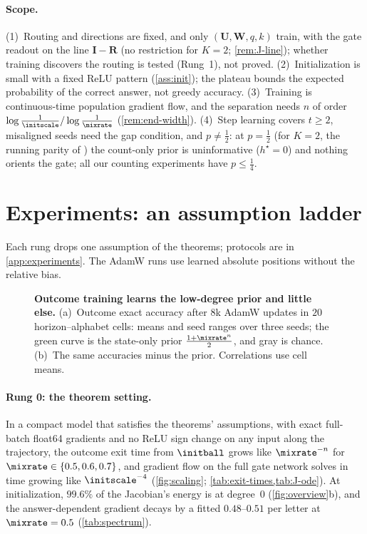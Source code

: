\paragraph{Scope.} (1)~Routing and directions are fixed, and only $(\mathbf U,\mathbf W,q,k)$ train, with the gate readout on the line
$\mathbf I-\mathbf R$ (no restriction for $K=2$; \cref{rem:J-line}); whether training discovers the routing is tested (Rung~1), not proved.
(2)~Initialization is small with a fixed ReLU pattern (\cref{ass:init}); the plateau bounds the expected probability of the correct answer,
not greedy accuracy. (3)~Training is continuous-time population gradient flow, and the separation needs $n$ of order
$\log\frac1\initscale/\log\frac1\mixrate$ (\cref{rem:end-width}). (4)~Step learning covers $t\ge2$, misaligned seeds need the gap condition, and
$p\ne\frac12$: at $p=\frac12$ (for $K=2$, the running parity of \citet{kim2024parity}) the count-only prior is uninformative ($h^\star=0$) and
nothing orients the gate; all our counting experiments have $p\le\frac14$.

\suppressfloats[t]
\section{Experiments: an assumption ladder}
\label{sec:experiments}
\label{sec:validation}

Each rung drops one assumption of the theorems; protocols are in \cref{app:experiments}. The AdamW runs use learned absolute positions
without the relative bias.

\begin{figure}[t]
\centering
\resizebox{\linewidth}{!}{}
\caption{\textbf{Outcome training learns the low-degree prior and little else.}
(a)~Outcome exact accuracy after $8$k AdamW updates in $20$ horizon--alphabet cells: means and seed ranges over three seeds; the green curve is the state-only prior $\frac{1+\mixrate^n}{2}$, and gray is chance.
(b)~The same accuracies minus the prior. Correlations use cell means.}
\label{fig:theory-measurement}
\label{fig:lambda-grid}
\end{figure}

\paragraph{Rung 0: the theorem setting.} In a compact model that satisfies the theorems' assumptions, with exact full-batch float64
gradients and no ReLU sign change on any input along the trajectory, the outcome exit time from $\initball$ grows like $\mixrate^{-n}$ for
$\mixrate\in\{0.5,0.6,0.7\}$, and gradient flow on the full gate network solves in time growing like
$\initscale^{-4}$ (\cref{fig:scaling}; \cref{tab:exit-times,tab:J-ode}).
At initialization, $99.6\%$ of the Jacobian's energy is at degree~$0$ (\cref{fig:overview}b), and the answer-dependent gradient decays by a
fitted $0.48$--$0.51$ per letter at $\mixrate=0.5$ (\cref{tab:spectrum}).

